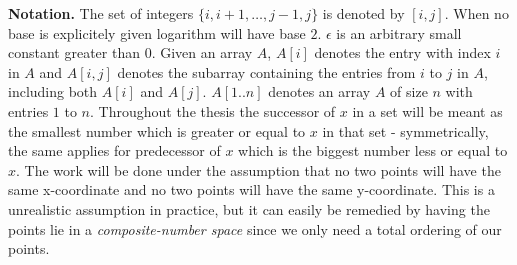 \noindent \textbf{Notation.} The set of integers $\{i, i+1, \dots, j-1, j\}$ is denoted by $[i,j]$. When no base is explicitely given logarithm will have base $2$. $\epsilon$ is an arbitrary small constant greater than $0$. Given an array $A$, $A[i]$ denotes the entry with index $i$ in $A$ and $A[i,j]$ denotes the subarray containing the entries from $i$ to $j$ in $A$, including both $A[i]$ and $A[j]$. $A[1..n]$ denotes an array $A$ of size $n$ with entries $1$ to $n$. Throughout the thesis the successor of $x$ in a set will be meant as the smallest number which is greater or equal to $x$ in that set - symmetrically, the same applies for predecessor of $x$ which is the biggest number less or equal to $x$. The work will be done under the assumption that no two points will  have the same x-coordinate and no two points will have the same y-coordinate. This is a unrealistic assumption in practice, but it can easily be remedied by having the points lie in a \emph{composite-number space} since we only need a total ordering of our points.



